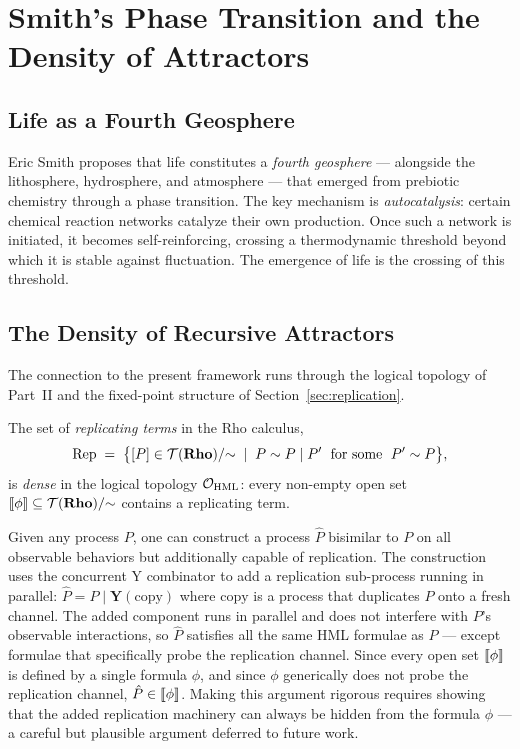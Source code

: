 \chapter{Smith's Phase Transition and the Density of Attractors}
\label{sec:phase}

\section{Life as a Fourth Geosphere}

Eric Smith proposes that life constitutes a \emph{fourth geosphere}
--- alongside the lithosphere, hydrosphere, and atmosphere ---
that emerged from prebiotic chemistry through a phase transition.
The key mechanism is \emph{autocatalysis}: certain chemical reaction
networks catalyze their own production.
Once such a network is initiated, it becomes self-reinforcing,
crossing a thermodynamic threshold beyond which it is stable against
fluctuation.
The emergence of life is the crossing of this threshold.

\section{The Density of Recursive Attractors}

The connection to the present framework runs through the logical
topology of Part~II and the fixed-point structure of
Section~\ref{sec:replication}.

\begin{conjecture}
\label{conj:density}
The set of \emph{replicating terms} in the Rho calculus,
\[
  \mathrm{Rep} \;=\;
  \bigl\{ [P] \in \mathcal{T}(\mathbf{Rho})/{\sim} \;\mid\;
    P \sim P \mid P' \;\text{ for some }\; P' \sim P \bigr\},
\]
is \emph{dense} in the logical topology $\mathcal{O}_{\mathrm{HML}}$:
every non-empty open set $\llbracket\phi\rrbracket \subseteq \mathcal{T}(\mathbf{Rho})/{\sim}$
contains a replicating term.
\end{conjecture}

\begin{remark}
Given any process $P$, one can construct a process $\hat{P}$
bisimilar to $P$ on all observable behaviors but additionally
capable of replication.
The construction uses the concurrent Y combinator to add
a replication sub-process running in parallel: 
$\hat{P} = P \mid \mathbf{Y}(\mathrm{copy})$
where $\mathrm{copy}$ is a process that duplicates $P$ onto a
fresh channel.
The added component runs in parallel and does not interfere with
$P$'s observable interactions, so $\hat{P}$ satisfies all the
same HML formulae as $P$ --- except formulae that specifically
probe the replication channel.
Since every open set $\llbracket\phi\rrbracket$ is defined by a single formula
$\phi$, and since $\phi$ generically does not probe the replication
channel, $\hat{P} \in \llbracket\phi\rrbracket$.
Making this argument rigorous requires showing that the added
replication machinery can always be hidden from the formula $\phi$
--- a careful but plausible argument deferred to future work.
\end{remark}

